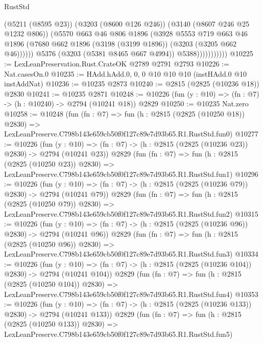 \begin{lexlean}{RustStd}
\begin{coremodule}
                            (@5211 (@8595 @23))
                            (@3203 (@8600 @126 @246))
                            (@3140 (@8607 @246 @25 @1232 @806))
                            (@5570
                              @663
                              @46
                              @806
                              @1896
                              (@3928
                                @5553
                                @719
                                @663
                                @46
                                @1896
                                (@7680 @662 @1896 (@3198 (@3199 @1896)) (@3203 (@3205 @662 @46))))))
                          @5376
                          (@3203 (@5381 @8465 @667 @4994))
                          @5388)))))))))))
@10225 := LexLeanPreservation.Rust.CrateOK @2789 @2791 @2793
@10226 := Nat.casesOn.{0}
@10235 := HAdd.hAdd.{0, 0, 0} @10 @10 @10 (instHAdd.{0} @10 instAddNat)
@10236 := @10235 @2873
@10240 := @2815 (@2825 (@10236 @18)) @2830
@10241 := @10235 @2871
@10248 := @10226 (fun (y : @10) => (fn : @7) -> (h : @10240) -> @2794 (@10241 @18)) @2829
@10250 := @10235 Nat.zero
@10258 := @10248
    (fun (fn : @7) =>
    fun (h : @2815 (@2825 (@10250 @18)) @2830) =>
    LexLeanPreserve.C798b143e659cb50f0f127c89e7d93b65.R1.RustStd.fun0)
@10277 := @10226
    (fun (y : @10) => (fn : @7) -> (h : @2815 (@2825 (@10236 @23)) @2830) -> @2794 (@10241 @23))
    @2829
    (fun (fn : @7) =>
    fun (h : @2815 (@2825 (@10250 @23)) @2830) =>
    LexLeanPreserve.C798b143e659cb50f0f127c89e7d93b65.R1.RustStd.fun1)
@10296 := @10226
    (fun (y : @10) => (fn : @7) -> (h : @2815 (@2825 (@10236 @79)) @2830) -> @2794 (@10241 @79))
    @2829
    (fun (fn : @7) =>
    fun (h : @2815 (@2825 (@10250 @79)) @2830) =>
    LexLeanPreserve.C798b143e659cb50f0f127c89e7d93b65.R1.RustStd.fun2)
@10315 := @10226
    (fun (y : @10) => (fn : @7) -> (h : @2815 (@2825 (@10236 @96)) @2830) -> @2794 (@10241 @96))
    @2829
    (fun (fn : @7) =>
    fun (h : @2815 (@2825 (@10250 @96)) @2830) =>
    LexLeanPreserve.C798b143e659cb50f0f127c89e7d93b65.R1.RustStd.fun3)
@10334 := @10226
    (fun (y : @10) => (fn : @7) -> (h : @2815 (@2825 (@10236 @104)) @2830) -> @2794 (@10241 @104))
    @2829
    (fun (fn : @7) =>
    fun (h : @2815 (@2825 (@10250 @104)) @2830) =>
    LexLeanPreserve.C798b143e659cb50f0f127c89e7d93b65.R1.RustStd.fun4)
@10353 := @10226
    (fun (y : @10) => (fn : @7) -> (h : @2815 (@2825 (@10236 @133)) @2830) -> @2794 (@10241 @133))
    @2829
    (fun (fn : @7) =>
    fun (h : @2815 (@2825 (@10250 @133)) @2830) =>
    LexLeanPreserve.C798b143e659cb50f0f127c89e7d93b65.R1.RustStd.fun5)

\end{coremodule}
\end{lexlean}
